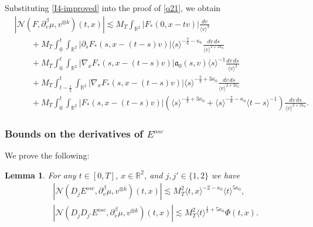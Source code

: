 \documentclass[reqno,11pt]{amsart}
\numberwithin{equation}{section}
\newtheorem{lemma}[theorem]{Lemma}
\begin{document}
	Substituting \eqref{I4-improved} into the proof of \eqref{q21}, we obtain
	\begin{equation}\label{q21-improved}
	\begin{split}
		&\left|\mathcal N(F,\partial_v^\beta\mu,v^{\otimes k})(t,x)\right|
		\lesssim
		M_T\int_{\mathbb R^2}
		|F_*(0,x-tv)|\frac{dv}{\langle v\rangle^3}\\
		&\qquad+M_T\int_0^t\int_{\mathbb R^2}
		|\partial_sF_*(s,x-(t-s)v)|
		\langle s\rangle^{-\frac76-\kappa_0}
		\frac{dv\,ds}{\langle v\rangle^{2+2\kappa_0}}\\
		&\qquad+M_T\int_0^t\int_{\mathbb R^2}
		|\nabla_xF_*(s,x-(t-s)v)|\mathfrak{a}_0(s,v)
		\langle s\rangle^{-1}
		\frac{dv\,ds}{\langle v\rangle^2}\\
		&\qquad+M_T\int_{t-\frac12}^t\int_{\mathbb R^2}
		|\nabla_xF_*(s,x-(t-s)v)|
		\langle s\rangle^{-\frac23+3\kappa_0}
		\frac{dv\,ds}{\langle v\rangle^{2+2\kappa_0}}\\
		&\qquad+M_T\int_0^t\int_{\mathbb R^2}
		|F_*(s,x-(t-s)v)|\left(\langle s\rangle^{-\frac43+3\kappa_0}+
		\langle s\rangle^{-\frac76-\kappa_0}
		\langle t-s\rangle^{-1}\right)
		\frac{dv\,ds}{\langle v\rangle^{2+2\kappa_0}}.
	\end{split}
	\end{equation}
	
	\subsubsection{Bounds on the derivatives of $E^{osc}$} We prove the following:
	
	\begin{lemma}\label{lem1Sec5}
	For any $t\in[0,T]$, $x\in\mathbb R^2$, and $j,j'\in\{1,2\}$ we have
	\begin{align}
		&\left|\mathcal N(D_jE^{osc},\partial_v^\beta\mu,v^{\otimes k})(t,x)\right|\lesssim
		M_T^2\langle t,x\rangle^{-2-\kappa_0}
		\langle t\rangle^{5\kappa_0},\label{q8}\\
		&\left|\mathcal N(D_jD_{j'}E^{osc},\partial_v^\beta\mu,v^{\otimes k})(t,x)\right|\lesssim
	M_T^2\langle t\rangle^{\frac13+5\kappa_0}\Phi(t,x).\label{q11}
\end{align}
	\end{lemma}
	
\end{document}
